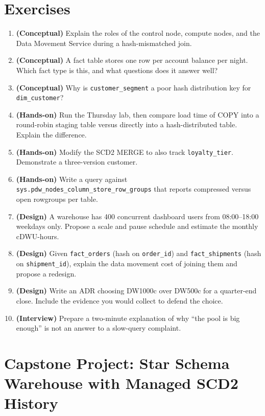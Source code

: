 \section{Exercises}
\begin{enumerate}
    \item \textbf{(Conceptual)} Explain the roles of the control node, compute nodes, and the Data Movement Service during a hash-mismatched join.
    \item \textbf{(Conceptual)} A fact table stores one row per account balance per night. Which fact type is this, and what questions does it answer well?
    \item \textbf{(Conceptual)} Why is \texttt{customer\_segment} a poor hash distribution key for \texttt{dim\_customer}?
    \item \textbf{(Hands-on)} Run the Thursday lab, then compare load time of COPY into a round-robin staging table versus directly into a hash-distributed table. Explain the difference.
    \item \textbf{(Hands-on)} Modify the SCD2 MERGE to also track \texttt{loyalty\_tier}. Demonstrate a three-version customer.
    \item \textbf{(Hands-on)} Write a query against \texttt{sys.pdw\_nodes\_column\_store\_row\_groups} that reports compressed versus open rowgroups per table.
    \item \textbf{(Design)} A warehouse has 400 concurrent dashboard users from 08:00--18:00 weekdays only. Propose a scale and pause schedule and estimate the monthly cDWU-hours.
    \item \textbf{(Design)} Given \texttt{fact\_orders} (hash on \texttt{order\_id}) and \texttt{fact\_shipments} (hash on \texttt{shipment\_id}), explain the data movement cost of joining them and propose a redesign.
    \item \textbf{(Design)} Write an ADR choosing DW1000c over DW500c for a quarter-end close. Include the evidence you would collect to defend the choice.
    \item \textbf{(Interview)} Prepare a two-minute explanation of why ``the pool is big enough'' is not an answer to a slow-query complaint.
\end{enumerate}

\section{Capstone Project: Star Schema Warehouse with Managed SCD2 History}\label{sec:ch5-capstone}

